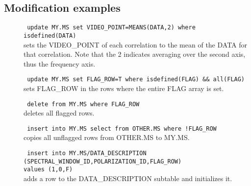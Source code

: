 \subsection{Modification examples}
\begin{description}
  \item[] \texttt{ update MY.MS set VIDEO\_POINT=MEANS(DATA,2)
                   where isdefined(DATA) }
      \\sets the VIDEO\_POINT of each correlation to the mean of the
      DATA for that correlation. Note that the 2 indicates averaging over
      the second axis, thus the frequency axis.

  \item[] \texttt{ update MY.MS set FLAG\_ROW=T where isdefined(FLAG) \&\& all(FLAG)}
      \\sets FLAG\_ROW in the rows where the entire FLAG array is set.

  \item[] \texttt{ delete from MY.MS where FLAG\_ROW}
      \\deletes all flagged rows.

  \item[] \texttt{ insert into MY.MS select from OTHER.MS where !FLAG\_ROW}
      \\copies all unflagged rows from OTHER.MS to MY.MS.

  \item[] \texttt{ insert into MY.MS/DATA\_DESCRIPTION}
          \\\texttt{(SPECTRAL\_WINDOW\_ID,POLARIZATION\_ID,FLAG\_ROW)}
          \\\texttt{values (1,0,F)}
      \\adds a row to the DATA\_DESCRIPTION subtable and initializes it.
                   
\end{description}


